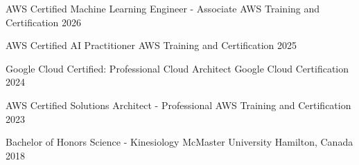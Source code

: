 %
%

\begin{cvhonors}

  \cvhonor
    {AWS Certified Machine Learning Engineer - Associate} %
    {AWS Training and Certification} %
    {} %
    {2026} %

  \cvhonor
    {AWS Certified AI Practitioner} %
    {AWS Training and Certification} %
    {} %
    {2025} %

  \cvhonor
    {Google Cloud Certified: Professional Cloud Architect} %
    {Google Cloud Certification} %
    {} %
    {2024} %

  \cvhonor
    {AWS Certified Solutions Architect - Professional} %
    {AWS Training and Certification} %
    {} %
    {2023} %

  \cvhonor
    {Bachelor of Honors Science - Kinesiology} %
    {McMaster University} %
    {Hamilton, Canada} %
    {2018} %

\end{cvhonors}
